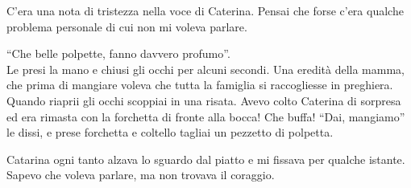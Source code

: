 C'era una nota di tristezza nella voce di Caterina. Pensai che forse c'era qualche problema personale di cui non mi voleva parlare.
\begin{dialogue}
   \enquote{Che belle polpette, fanno davvero profumo}.\\
  Le presi la mano e chiusi gli occhi per alcuni secondi. Una eredità della mamma, che prima di mangiare voleva che tutta la famiglia si raccogliesse in preghiera. Quando riaprii gli occhi scoppiai in una risata. Avevo colto Caterina di sorpresa ed era rimasta con la forchetta di fronte alla bocca! Che buffa!
   \enquote{Dai, mangiamo} le dissi, e prese forchetta e coltello tagliai un pezzetto di polpetta.
\end{dialogue}


Catarina ogni tanto alzava lo sguardo dal piatto e mi fissava per qualche istante. Sapevo che voleva parlare, ma non trovava il coraggio.

